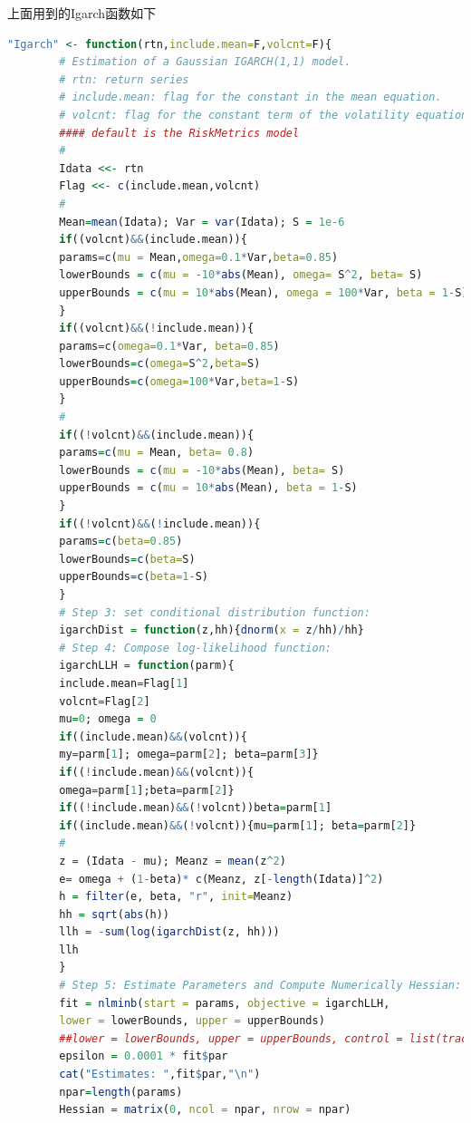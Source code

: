         \par
        上面用到的Igarch函数如下
        \begin{lstlisting}[language = R]
        "Igarch" <- function(rtn,include.mean=F,volcnt=F){
        # Estimation of a Gaussian IGARCH(1,1) model.
        # rtn: return series
        # include.mean: flag for the constant in the mean equation.
        # volcnt: flag for the constant term of the volatility equation.
        #### default is the RiskMetrics model
        #
        Idata <<- rtn
        Flag <<- c(include.mean,volcnt)
        #
        Mean=mean(Idata); Var = var(Idata); S = 1e-6
        if((volcnt)&&(include.mean)){
        params=c(mu = Mean,omega=0.1*Var,beta=0.85)
        lowerBounds = c(mu = -10*abs(Mean), omega= S^2, beta= S)
        upperBounds = c(mu = 10*abs(Mean), omega = 100*Var, beta = 1-S)
        }
        if((volcnt)&&(!include.mean)){
        params=c(omega=0.1*Var, beta=0.85)
        lowerBounds=c(omega=S^2,beta=S)
        upperBounds=c(omega=100*Var,beta=1-S)
        }
        #
        if((!volcnt)&&(include.mean)){
        params=c(mu = Mean, beta= 0.8)
        lowerBounds = c(mu = -10*abs(Mean), beta= S)
        upperBounds = c(mu = 10*abs(Mean), beta = 1-S)
        }
        if((!volcnt)&&(!include.mean)){
        params=c(beta=0.85)
        lowerBounds=c(beta=S)
        upperBounds=c(beta=1-S)
        }
        # Step 3: set conditional distribution function:
        igarchDist = function(z,hh){dnorm(x = z/hh)/hh}
        # Step 4: Compose log-likelihood function:
        igarchLLH = function(parm){
        include.mean=Flag[1]
        volcnt=Flag[2]
        mu=0; omega = 0
        if((include.mean)&&(volcnt)){
        my=parm[1]; omega=parm[2]; beta=parm[3]}
        if((!include.mean)&&(volcnt)){
        omega=parm[1];beta=parm[2]}
        if((!include.mean)&&(!volcnt))beta=parm[1]
        if((include.mean)&&(!volcnt)){mu=parm[1]; beta=parm[2]}
        #
        z = (Idata - mu); Meanz = mean(z^2)
        e= omega + (1-beta)* c(Meanz, z[-length(Idata)]^2)
        h = filter(e, beta, "r", init=Meanz)
        hh = sqrt(abs(h))
        llh = -sum(log(igarchDist(z, hh)))
        llh
        }
        # Step 5: Estimate Parameters and Compute Numerically Hessian:
        fit = nlminb(start = params, objective = igarchLLH,
        lower = lowerBounds, upper = upperBounds)
        ##lower = lowerBounds, upper = upperBounds, control = list(trace=3))
        epsilon = 0.0001 * fit$par
        cat("Estimates: ",fit$par,"\n")
        npar=length(params)
        Hessian = matrix(0, ncol = npar, nrow = npar)

\end{lstlisting}
